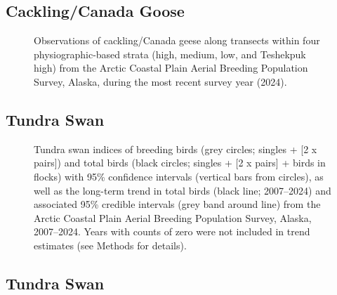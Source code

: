 \documentclass[
]{article}
\begin{document}
\endgroup{}

\newpage{}

\subsection*{Cackling/Canada Goose}\label{cacklingcanada-goose-2}

\begin{figure}


\caption{\label{fig-CCGOmap}Observations of cackling/Canada geese along
transects within four physiographic-based strata (high, medium, low, and
Teshekpuk high) from the Arctic Coastal Plain Aerial Breeding Population
Survey, Alaska, during the most recent survey year (2024).}

\end{figure}%

\newpage{}

\subsection*{Tundra Swan}\label{tundra-swan}

\begin{figure}


\caption{\label{fig-SWAN}Tundra swan indices of breeding birds (grey
circles; singles + {[}2 x pairs{]}) and total birds (black circles;
singles + {[}2 x pairs{]} + birds in flocks) with 95\% confidence
intervals (vertical bars from circles), as well as the long-term trend
in total birds (black line; 2007--2024) and associated 95\% credible
intervals (grey band around line) from the Arctic Coastal Plain Aerial
Breeding Population Survey, Alaska, 2007--2024. Years with counts of
zero were not included in trend estimates (see Methods for details).}

\end{figure}%

\newpage{}

\subsection*{Tundra Swan}\label{tundra-swan-1}
\end{document}

